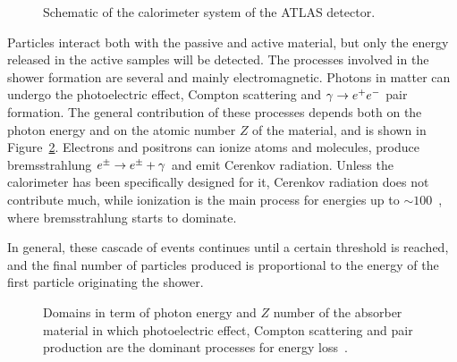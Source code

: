 \begin{figure}[tb]\begin{center}
	\caption{Schematic of the calorimeter system of the ATLAS detector.\label{fig:calorimeters}}
\end{center}\end{figure}

Particles interact both with the passive and active material, but only the energy released
in the active samples will be detected. 
The processes involved in the shower formation are several and mainly electromagnetic.
Photons in matter can undergo the photoelectric effect, Compton scattering and $\gamma \to \epem$
pair formation. The general contribution of these processes depends both on the photon energy
and on the atomic number $Z$ of the material, and is shown in Figure~\ref{fig:photonsmatter}.
Electrons and positrons can ionize atoms and molecules, produce bremsstrahlung $\epm \to \epm + \gamma$
and emit Cerenkov radiation. Unless the calorimeter has been specifically designed for it,
 Cerenkov radiation does not contribute much, while ionization is the main process for energies
up to $\sim 100$~\mev, where bremsstrahlung starts to dominate.

In general, these cascade of events
continues until a certain threshold is reached, and the final number of particles
produced is proportional to the energy of the first particle originating the shower.

\begin{figure}[tb]\begin{center}
	\caption{Domains in term of photon energy and $Z$ number of the absorber material
        in which photoelectric effect, Compton scattering and pair production are the 
        dominant processes for energy loss~\cite{Wigmans}.\label{fig:photonsmatter}}
\end{center}\end{figure}

